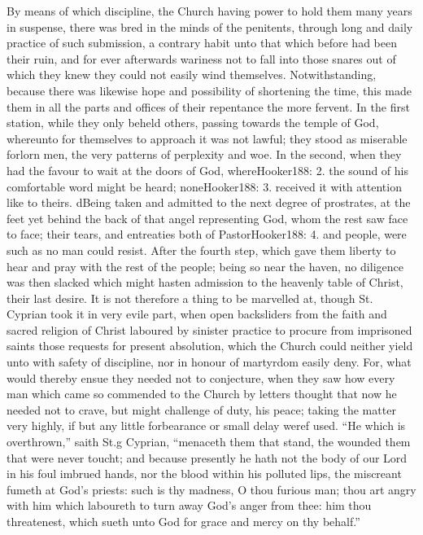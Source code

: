 By means of which discipline, the Church having power to hold them many years in suspense, there was bred in the minds of the penitents, through long and daily practice of such submission, a contrary habit unto that which before had been their ruin, and for ever afterwards wariness not to fall into those snares out of which they knew they could not easily wind themselves. Notwithstanding, because there was likewise hope and possibility of shortening the time, this made them in all the parts and offices of their repentance the more fervent. In the first station, while they only beheld others, passing towards the temple of God, whereunto for themselves  to approach it was not lawful; they stood as miserable forlorn men, the very patterns of perplexity and woe. In the second, when they had the favour to wait at the doors of God, whereHooker188: 2. the sound of his comfortable word might be heard; noneHooker188: 3. received it with attention like to theirs. dBeing taken and admitted to the next degree of prostrates, at the feet yet behind the back of that angel representing God, whom the rest saw face to face; their tears, and entreaties both of PastorHooker188: 4. and people, were such as no man could resist. After the fourth step, which gave them liberty to hear and pray with the rest of the people; being so near the haven, no diligence was then slacked which might hasten admission to the heavenly table of Christ, their last desire. It is not therefore a thing to be marvelled at, though St. Cyprian took it in very evile part, when open backsliders from the faith and sacred religion of Christ laboured by sinister practice to procure from imprisoned saints those requests for present absolution, which the Church could neither yield unto with safety of discipline, nor in honour of martyrdom easily deny. For, what would thereby ensue they needed not to conjecture, when they saw how every man which came so commended to the Church by letters thought that now he needed not to crave, but might challenge of duty, his peace; taking the matter very highly, if but any little forbearance or small delay weref used. “He which is overthrown,” saith St.g Cyprian, “menaceth them that stand, the wounded them that were never toucht; and because presently he hath not the body of our Lord in his foul imbrued hands, nor the blood within his polluted lips, the miscreant fumeth at God’s priests: such is thy madness, O thou furious man; thou art angry with him which laboureth to turn away God’s anger from thee: him thou threatenest, which sueth unto God for grace and mercy on thy behalf.”


